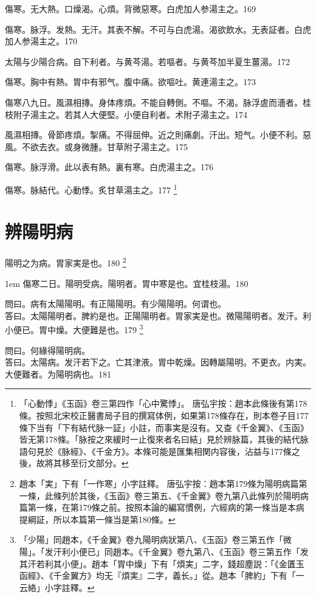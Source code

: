 傷寒。无大熱。口燥渴。心煩。背微惡寒。白虎{\khaai 加人参}湯主之。169

傷寒。脉浮。发熱。无汗。其表不解。不可与白虎湯。渴欲飲水。无表証者。白虎{\khaai 加人参}湯主之。170

太陽与少陽合病。自下利者。与黄芩湯。若嘔者。与黄芩加半夏生薑湯。172

傷寒。胸中有熱。胃中有邪气。腹中痛。欲嘔吐。黄連湯主之。173

傷寒八九日。風濕相摶。身体疼煩。不能自轉側。不嘔。不渴。脉浮虗而濇者。桂枝附子湯主之。若其人大便堅。小便自利者。术附子湯主之。174

風濕相摶。骨節疼煩。掣痛。不得屈伸。近之則痛劇。汗出。短气。小便不利。惡風。不欲去衣。或身微腫。甘草附子湯主之。175

傷寒。脉浮滑。此以表有熱。裏有寒。白虎湯主之。176

傷寒。脉結代。心動悸。炙甘草湯主之。177
	\footnote{
		「心動悸」《玉函》卷三第四作「心中驚悸」。
		唐弘宇按：趙本此條後有第178條。按照北宋校正醫書局子目的撰寫体例，如果第178條存在，則本卷子目177條下当有「下有結代脉一証」小註，而事実是沒有。又查《千金翼》、《玉函》皆无第178條。「脉按之來緩时一止復來者名曰結」見於辨脉篇，其後的結代脉語句見於《脉經》、《千金方》。本條可能是匯集相関内容後，沾益与177條之後，故將其移至衍文部分。
		}

\chapter{辨陽明病}

陽明之为病。胃家実是也。180
	\footnote{
		趙本「実」下有「一作寒」小字註釋。
		唐弘宇按：趙本第179條为陽明病篇第一條，此條列於其後，《玉函》卷三第五、《千金翼》卷九第八此條列於陽明病篇第一條，在第179條之前。按照本論的編寫慣例，六經病的第一條当是本病提綱証，所以本篇第一條当是第180條。
	}

\hangindent 1em
傷寒二日。陽明受病。陽明者。胃中寒是也。宜桂枝湯。{\shenghui}180

問曰。病有太陽陽明。有正陽陽明。有少陽陽明。何谓也。\\
答曰。太陽陽明者。脾約是也。正陽陽明者。胃家実是也。微陽陽明者。发汗。利小便已。胃中燥。大便難是也。179
	\footnote{
		「少陽」同趙本，《千金翼》卷九陽明病狀第八、《玉函》卷三第五作「微陽」。「发汗利小便已」同趙本。《千金翼》卷九第八、《玉函》卷三第五作「发其汗若利其小便」。趙本「胃中燥」下有「煩実」二字，錢超塵説：「《金匱玉函經》、《千金翼方》均无『煩実』二字，義长。」從。趙本「脾約」下有「一云絡」小字註釋。
	}

問曰。何緣得陽明病。\\
答曰。太陽病。发汗若下之。亡其津液。胃中乾燥。因轉屬陽明。不更衣。{\khaai 内実。}大便難者。为陽明病也。181

